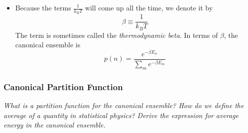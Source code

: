 \documentclass[11pt, a4paper]{article}
\begin{document}
\begin{itemize}
	\item Because the terms $ \frac{1}{k_{B}T} $ will come up all the time, we denote it by
	\begin{equation*}
		\beta \equiv \frac{1}{k_{B}T}
	\end{equation*}
	The term is sometimes called the \textit{thermodynamic beta}. In terms of $ \beta $, the canonical ensemble is
	\begin{equation*}
		p(n) =  \frac{ e^{-\beta E_{n}}}{\sum_{m} e^{-\beta E_{m}}}
	\end{equation*}
	
	
\end{itemize}


\subsubsection{Canonical Partition Function}
\textit{What is a partition function for the canonical ensemble? How do we define the average of a quantity in statistical physics? Derive the expression for average energy in the canonical ensemble.}
\end{document}

